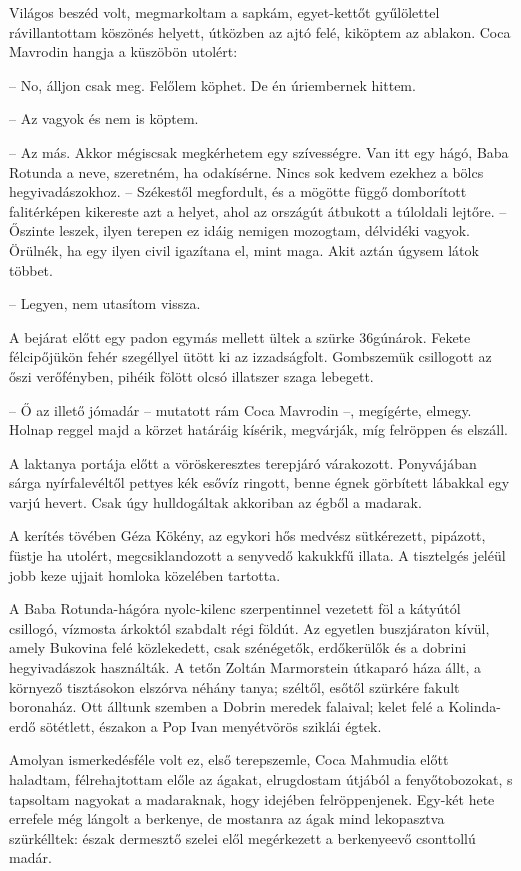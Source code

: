 \documentclass{IEEEtran}
\begin{document}
Világos beszéd volt, megmarkoltam a sapkám, egyet-kettőt gyűlölettel
rávillantottam köszönés helyett, útközben az ajtó felé, kiköptem az ablakon.
Coca Mavrodin hangja a küszöbön utolért:

– No, álljon csak meg. Felőlem köphet. De én úriembernek hittem.

– Az vagyok és nem is köptem.

– Az más. Akkor mégiscsak megkérhetem egy szívességre. Van itt egy hágó, Baba
Rotunda a neve, szeretném, ha odakísérne. Nincs sok kedvem ezekhez a bölcs
hegyivadászokhoz. – Székestől megfordult, és a mögötte függő domborított
falitérképen kikereste azt a helyet, ahol az országút átbukott a túloldali
lejtőre. – Őszinte leszek, ilyen terepen ez idáig nemigen mozogtam, délvidéki
vagyok. Örülnék, ha egy ilyen civil igazítana el, mint maga. Akit aztán úgysem
látok többet.

– Legyen, nem utasítom vissza.

A bejárat előtt egy padon egymás mellett ültek a szürke 36gúnárok. Fekete
félcipőjükön fehér szegéllyel ütött ki az izzadságfolt. Gombszemük csillogott
az őszi verőfényben, pihéik fölött olcsó illatszer szaga lebegett.

– Ő az illető jómadár – mutatott rám Coca Mavrodin –, megígérte, elmegy.
Holnap reggel majd a körzet határáig kísérik, megvárják, míg felröppen és
elszáll.

A laktanya portája előtt a vöröskeresztes terepjáró várakozott. Ponyvájában
sárga nyírfalevéltől pettyes kék esővíz ringott, benne égnek görbített
lábakkal egy varjú hevert. Csak úgy hulldogáltak akkoriban az égből a madarak.

A kerítés tövében Géza Kökény, az egykori hős medvész sütkérezett, pipázott,
füstje ha utolért, megcsiklandozott a senyvedő kakukkfű illata. A tisztelgés
jeléül jobb keze ujjait homloka közelében tartotta.

A Baba Rotunda-hágóra nyolc-kilenc szerpentinnel vezetett föl a kátyútól
csillogó, vízmosta árkoktól szabdalt régi földút. Az egyetlen buszjáraton
kívül, amely Bukovina felé közlekedett, csak szénégetők, erdőkerülők és a
dobrini hegyivadászok használták. A tetőn Zoltán Marmorstein útkaparó háza
állt, a környező tisztásokon elszórva néhány tanya; széltől, esőtől szürkére
fakult boronaház. Ott álltunk szemben a Dobrin meredek falaival; kelet felé a
Kolinda-erdő sötétlett, északon a Pop Ivan menyétvörös sziklái égtek.

Amolyan ismerkedésféle volt ez, első terepszemle, Coca Mahmudia előtt
haladtam, félrehajtottam előle az ágakat, elrugdostam útjából a
fenyőtobozokat, s tapsoltam nagyokat a madaraknak, hogy idejében
felröppenjenek. Egy-két hete errefele még lángolt a berkenye, de mostanra az
ágak mind lekopasztva szürkélltek: észak dermesztő szelei elől megérkezett a
berkenyeevő csonttollú madár.
\end{document}
